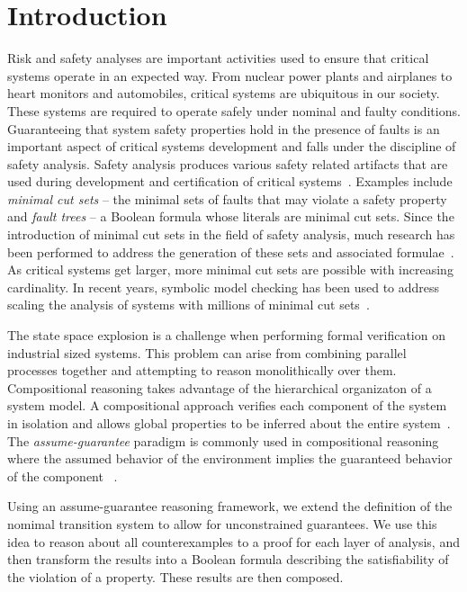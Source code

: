\section{Introduction}
\label{sec:intro}

Risk and safety analyses are important activities used to ensure that critical systems operate in an expected way. From nuclear power plants and airplanes to heart monitors and automobiles, critical systems are ubiquitous in our society. These systems are required to operate safely under nominal and faulty conditions. Guaranteeing that system safety properties hold in the presence of faults is an important aspect of critical systems development and falls under the discipline of safety analysis. Safety analysis produces various safety related artifacts that are used during development and certification of critical systems~\cite{SAE:ARP4754A}. Examples include {\em minimal cut sets} -- the minimal sets of faults that may violate a safety property and {\em fault trees} -- a Boolean formula whose literals are minimal cut sets. Since the introduction of minimal cut sets in the field of safety analysis, much research has been performed to address the generation of these sets and associated formulae~\cite{vesely1981fault,fta:survey,historyFTA}. As critical systems get larger, more minimal cut sets are possible with increasing cardinality. In recent years, symbolic model checking has been used to address scaling the analysis of systems with millions of minimal cut sets~\cite{bieber2002combination,schafer2003combining,symbFTA}. 

The state space explosion is a challenge when performing formal verification on industrial sized systems. This problem can arise from combining parallel processes together and attempting to reason monolithically over them. Compositional reasoning takes advantage of the hierarchical organizaton of a system model. A compositional approach verifies each component of the system in isolation and allows global properties to be inferred about the entire system~\cite{berezin1997compositional}. The {\em assume-guarantee} paradigm is commonly used in compositional reasoning where the assumed behavior of the environment implies the guaranteed behavior of the component ~\cite{NFM2012:CoGaMiWhLaLu}.

Using an assume-guarantee reasoning framework, we extend the definition of the nomimal transition system to allow for unconstrained guarantees. We use this idea to reason about all counterexamples to a proof for each layer of analysis, and then transform the results into a Boolean formula describing the satisfiability of the violation of a property. These results are then composed. 


